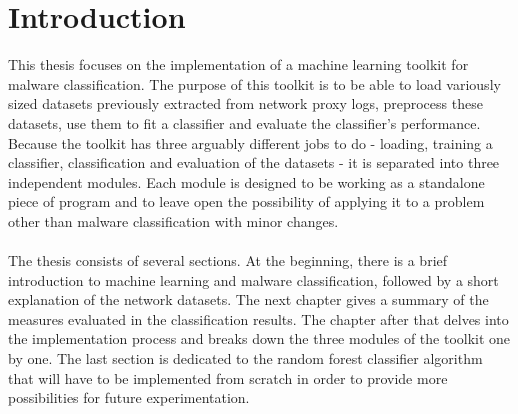 \documentclass[11pt]{article}
\begin{document}
  \section*{Introduction}
    This thesis focuses on the implementation of a machine learning toolkit for malware classification. The purpose of this toolkit is to be able to load variously sized datasets previously extracted from network proxy logs, preprocess these datasets, use them to fit a classifier and evaluate the classifier's performance. Because the toolkit has three arguably different jobs to do - loading, training a classifier, classification and evaluation of the datasets - it is separated into three independent modules. Each module is designed to be working as a standalone piece of program and to leave open the possibility of applying it to a problem other than malware classification with minor changes.
    \\~\\
    The thesis consists of several sections. At the beginning, there is a brief introduction to machine learning and malware classification, followed by a short explanation of the network datasets. The next chapter gives a summary of the measures evaluated in the classification results. The chapter after that delves into the implementation process and breaks down the three modules of the toolkit one by one. The last section is dedicated to the random forest classifier algorithm that will have to be implemented from scratch in order to provide more possibilities for future experimentation.
  \newpage
\end{document}
